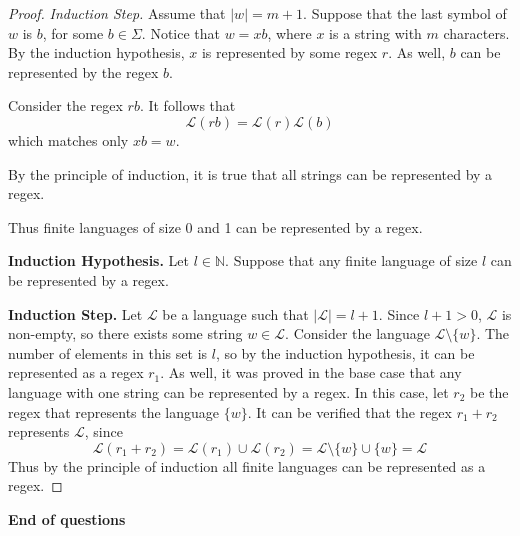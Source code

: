 \documentclass[11pt]{article}
\begin{document}
\begin{enumerate}[label=\textbf{Q\arabic*.}]
\begin{proof}
	\textit{Induction Step.} Assume that \(|w| = m+1\). Suppose that the last symbol of \(w\) is \(b\), for some \(b \in \Sigma\). Notice that \(w = xb\), where \(x\) is a string with \(m\) characters. By the induction hypothesis, \(x\) is represented by some regex \(r\). As well, \(b\) can be represented by the regex \(b\).

	Consider the regex \(rb\). It follows that
	\[
		\mathcal{L} (rb) = \mathcal{L} (r) \mathcal{L} (b)
	\]
	which matches only \(xb = w\).

	By the principle of induction, it is true that all strings can be represented by a regex.

	Thus finite languages of size 0 and 1 can be represented by a regex.

	\textbf{Induction Hypothesis.} Let \(l \in \mathbb{N}\). Suppose that any finite language of size \(l\) can be represented by a regex.

	\textbf{Induction Step.} Let \(\mathcal{L}\) be a language such that \(|\mathcal{L}| = l + 1\). Since \(l+1 > 0\), \(\mathcal{L}\) is non-empty, so there exists some string \(w \in \mathcal{L}\). Consider the language \(\mathcal{L} \setminus \{w\}\). The number of elements in this set is \(l\), so by the induction hypothesis, it can be represented as a regex \(r_1\). As well, it was proved in the base case that any language with one string can be represented by a regex. In this case, let \(r_2\) be the regex that represents the language \(\{w\}\). It can be verified that the regex \(r_1 + r_2\) represents \(\mathcal{L}\), since
	\[
		\mathcal{L} (r_1 + r_2) = \mathcal{L} (r_1) \cup \mathcal{L} (r_2) = \mathcal{L} \setminus \{w\} \cup \{w\} = \mathcal{L}
	\]
	Thus by the principle of induction all finite languages can be represented as a regex.

\end{proof}


	\end{enumerate}

\vspace{1cm}

 \textbf{End of questions}
\end{document}
